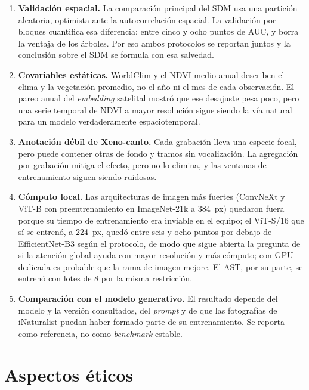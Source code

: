 \begin{enumerate}[leftmargin=*, itemsep=3pt]
  \item \textbf{Validación espacial.} La comparación principal del SDM usa una
        partición aleatoria, optimista ante la autocorrelación espacial. La
        validación por bloques cuantifica esa diferencia: entre cinco y ocho
        puntos de AUC, y borra la ventaja de los árboles. Por eso ambos
        protocolos se reportan juntos y la conclusión sobre el SDM se formula
        con esa salvedad.
  \item \textbf{Covariables estáticas.} WorldClim y el NDVI medio anual
        describen el clima y la vegetación promedio, no el año ni el mes de
        cada observación. El pareo anual del \textit{embedding} satelital
        mostró que ese desajuste pesa poco, pero una serie temporal de NDVI a
        mayor resolución sigue siendo la vía natural para un modelo
        verdaderamente espaciotemporal.
  \item \textbf{Anotación débil de Xeno-canto.} Cada grabación lleva una
        especie focal, pero puede contener otras de fondo y tramos sin
        vocalización. La agregación por grabación mitiga el efecto, pero no lo
        elimina, y las ventanas de entrenamiento siguen siendo ruidosas.
  \item \textbf{Cómputo local.} Las arquitecturas de imagen más fuertes
        (ConvNeXt y ViT-B con preentrenamiento en ImageNet-21k a
        \SI{384}{px}) quedaron fuera porque su tiempo de entrenamiento era
        inviable en el equipo; el ViT-S/16 que sí se entrenó, a \SI{224}{px},
        quedó entre seis y ocho puntos por debajo de EfficientNet-B3 según el
        protocolo, de modo que sigue abierta la pregunta de si la atención
        global ayuda con mayor resolución y más cómputo; con GPU dedicada es
        probable que la rama de imagen mejore. El AST, por su parte, se
        entrenó con lotes de 8 por la misma restricción.
  \item \textbf{Comparación con el modelo generativo.} El resultado depende del
        modelo y la versión consultados, del \textit{prompt} y de que las
        fotografías de iNaturalist puedan haber formado parte de su
        entrenamiento. Se reporta como referencia, no como \textit{benchmark}
        estable.
\end{enumerate}

\section{Aspectos éticos}\label{sec:etica}

